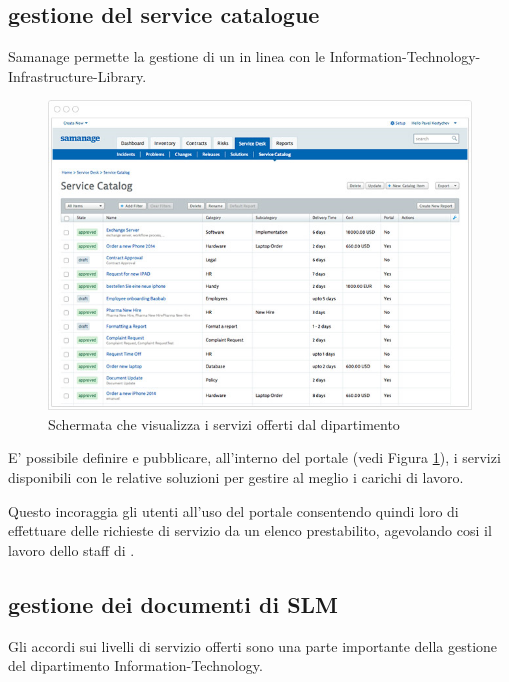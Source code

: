 \subsection[Gestione del service catalogue]{gestione del service catalogue}
\label{sd-tools-sc}
Samanage permette la gestione di un  in linea con le  \ac{Information-Technology-Infrastructure-Library}.

\begin{figure}[htbp]
\centering
\includegraphics[scale=0.6]{Images/samanage/Service_catalogue.png}
\caption{Schermata che visualizza i servizi offerti dal dipartimento}
\label{sd-tools-sc-img}
\end{figure}

E' possibile definire e pubblicare, all'interno del portale (vedi Figura \ref{sd-tools-sc-img}), i servizi disponibili con le relative soluzioni per gestire al meglio i carichi di lavoro.

Questo incoraggia gli utenti all'uso del portale  consentendo quindi loro di effettuare delle richieste di servizio da un elenco prestabilito, agevolando cosi il lavoro dello staff di .

\subsection[Gestione dei documenti di SLM]{gestione dei documenti di SLM}
\label{sd-tools-sla}
Gli accordi sui livelli di servizio offerti sono una parte importante della gestione del dipartimento \acs{Information-Technology}.

